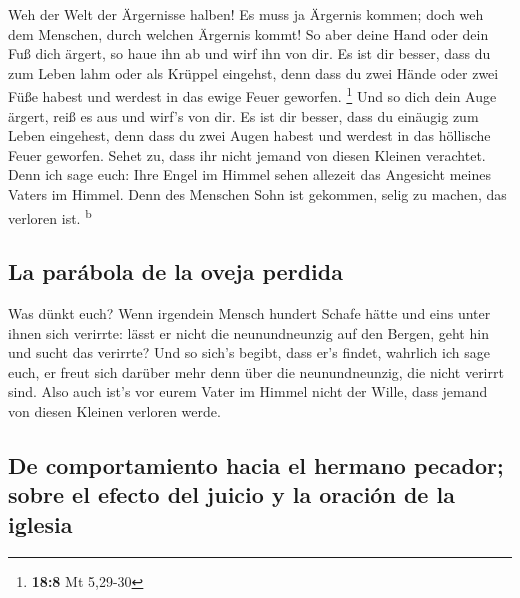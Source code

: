  Weh der Welt der Ärgernisse halben! Es muss ja Ärgernis
kommen; doch weh dem Menschen, durch welchen Ärgernis kommt!
 So aber deine Hand oder dein Fuß dich ärgert, so haue ihn
ab und wirf ihn von dir. Es ist dir besser, dass du zum Leben lahm oder
als Krüppel eingehst, denn dass du zwei Hände oder zwei Füße habest und
werdest in das ewige Feuer geworfen. \footnote{\textbf{18:8} Mt 5,29-30}
 Und so dich dein Auge ärgert, reiß es aus und wirf's von
dir. Es ist dir besser, dass du einäugig zum Leben eingehest, denn dass
du zwei Augen habest und werdest in das höllische Feuer geworfen.
 Sehet zu, dass ihr nicht jemand von diesen Kleinen
verachtet. Denn ich sage euch: Ihre Engel im Himmel sehen allezeit das
Angesicht meines Vaters im Himmel.  Denn des Menschen
Sohn ist gekommen, selig zu machen, das verloren ist.
\textsuperscript{b}

\hypertarget{la-paruxe1bola-de-la-oveja-perdida}{%
\subsection{La parábola de la oveja
perdida}\label{la-paruxe1bola-de-la-oveja-perdida}}

 Was dünkt euch? Wenn irgendein Mensch hundert Schafe
hätte und eins unter ihnen sich verirrte: lässt er nicht die
neunundneunzig auf den Bergen, geht hin und sucht das verirrte?
 Und so sich's begibt, dass er's findet, wahrlich ich
sage euch, er freut sich darüber mehr denn über die neunundneunzig, die
nicht verirrt sind.  Also auch ist's vor eurem Vater im
Himmel nicht der Wille, dass jemand von diesen Kleinen verloren werde.

\hypertarget{de-comportamiento-hacia-el-hermano-pecador-sobre-el-efecto-del-juicio-y-la-oraciuxf3n-de-la-iglesia}{%
\subsection{De comportamiento hacia el hermano pecador; sobre el efecto
del juicio y la oración de la
iglesia}\label{de-comportamiento-hacia-el-hermano-pecador-sobre-el-efecto-del-juicio-y-la-oraciuxf3n-de-la-iglesia}}

